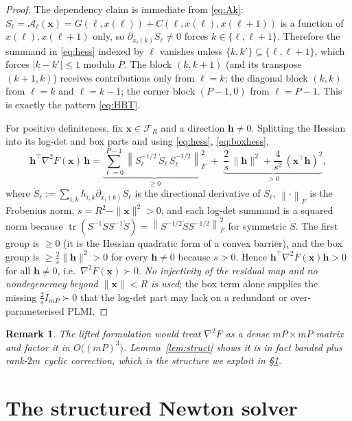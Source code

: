 \documentclass{amsart}
\newtheorem{remark}{Remark}
\newcommand{\tr}{\operatorname{tr}}
\newcommand{\norm}[1]{\left\lVert#1\right\rVert}
\begin{document}
\begin{proof}
The dependency claim is immediate from \eqref{eq:Ak}: $S_\ell=\mathcal A_\ell(\bm
x)=G(\ell,x(\ell))+C(\ell,x(\ell),x(\ell+1))$ is a function of $x(\ell),x(\ell+1)$
only, so $\partial_{x_i(k)}S_\ell\neq0$ forces $k\in\{\ell,\ell+1\}$. Therefore the
summand in \eqref{eq:hess} indexed by $\ell$ vanishes unless
$\{k,k'\}\subseteq\{\ell,\ell+1\}$, which forces $|k-k'|\le1$ modulo $P$. The block
$(k,k+1)$ (and its transpose $(k+1,k)$) receives contributions only from $\ell=k$;
the diagonal block $(k,k)$ from $\ell=k$ and $\ell=k-1$; the corner block $(P-1,0)$
from $\ell=P-1$. This is exactly the pattern \eqref{eq:HBT}.

For positive definiteness, fix $\bm x\in\mathcal F_R$ and a direction $\bm h\neq0$.
Splitting the Hessian into its log-det and box parts and using \eqref{eq:hess},
\eqref{eq:boxhess},
\[
  \bm h^{\!\top}\nabla^2 F(\bm x)\,\bm h
  =\underbrace{\sum_{\ell=0}^{P-1}\norm{S_\ell^{-1/2}\,\dot S_\ell\,S_\ell^{-1/2}}_F^2}_{\ge0}
   \;+\;\underbrace{\frac{2}{s}\,\|\bm h\|^2+\frac{4}{s^2}\,(\bm x^{\!\top}\bm h)^2}_{>0},
\]
where $\dot S_\ell:=\sum_{i,k}h_{i,k}\partial_{x_i(k)}S_\ell$ is the directional
derivative of $S_\ell$, $\norm{\cdot}_F$ is the Frobenius norm, $s=R^2-\|\bm x\|^2>0$,
and each log-det summand is a squared norm because
$\tr(S^{-1}\dot S S^{-1}\dot S)=\norm{S^{-1/2}\dot S S^{-1/2}}_F^2$ for symmetric
$\dot S$. The first group is $\ge0$ (it is the Hessian quadratic form of a convex
barrier), and the box group is $\ge\frac{2}{s}\|\bm h\|^2>0$ for every $\bm h\neq0$
because $s>0$. Hence $\bm h^{\!\top}\nabla^2F(\bm x)\bm h>0$ for all $\bm h\neq0$,
i.e.\ $\nabla^2F(\bm x)\succ0$. \emph{No injectivity of the residual map and no
nondegeneracy beyond $\|\bm x\|<R$ is used}; the box term alone supplies the missing
$\frac{2}{s}I_{mP}\succ0$ that the log-det part may lack on a redundant or
over-parameterised PLMI.
\end{proof}

\begin{remark}
The lifted formulation would treat $\nabla^2F$ as a dense $mP\times mP$ matrix and
factor it in $O\!\big((mP)^3\big)$. Lemma~\ref{lem:struct} shows it is in fact
banded plus rank-$2m$ cyclic correction, which is the structure we exploit in
\S\ref{sec:linalg}.
\end{remark}

\section{The structured Newton solver}\label{sec:linalg}
\end{document}

